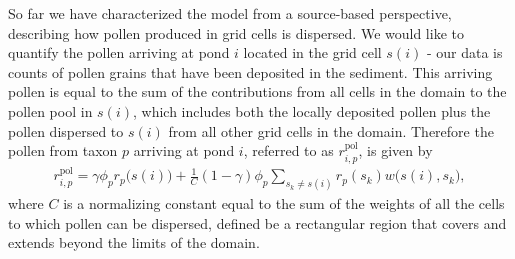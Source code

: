 \documentclass[12pt]{article}
\begin{document}

So far we have characterized the model from a source-based
perspective, describing how pollen produced in grid cells is
dispersed. We would like to quantify the pollen arriving at pond $i$
located in the grid cell $s(i)$ - our data is counts of pollen grains
that have been deposited in the sediment. This arriving pollen is
equal to the sum of the contributions from all cells in the domain to
the pollen pool in $s(i)$, which includes both the locally deposited
pollen plus the pollen dispersed to $s(i)$ from all other grid cells
in the domain. Therefore the pollen from taxon $p$ arriving at pond
$i$, referred to as $r_{i,p}^{\text{pol}}$, is given by
\begin{align}
r_{i,p}^{\text{pol}} = \gamma \phi_p r_p\bigl(s(i)\bigr) + \frac{1}{C} (1-\gamma) \phi_p \sum_{s_k \neq s(i) } r_p(s_k) w\bigl(s(i), s_k\bigr),
\label{eq:arriving}
\end{align}
where $C$ is a normalizing constant equal to the sum of the weights of
all the cells to which pollen can be dispersed, defined be a
rectangular region that covers and extends beyond the limits of the
domain.
\end{document}
